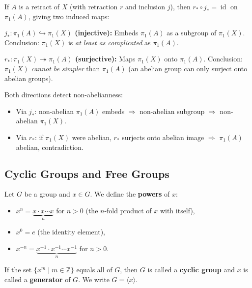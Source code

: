 \documentclass[11pt]{report}
\begin{document}
\begin{rembox}
If $A$ is a retract of $X$ (with retraction $r$ and inclusion $j$), then $r_* \circ j_* = \operatorname{id}$ on $\pi_1(A)$, giving two induced maps:

\textbf{$j_*: \pi_1(A) \hookrightarrow \pi_1(X)$ (injective):} Embeds $\pi_1(A)$ as a subgroup of $\pi_1(X)$. Conclusion: $\pi_1(X)$ is \emph{at least as complicated} as $\pi_1(A)$.

\textbf{$r_*: \pi_1(X) \twoheadrightarrow \pi_1(A)$ (surjective):} Maps $\pi_1(X)$ onto $\pi_1(A)$. Conclusion: $\pi_1(X)$ \emph{cannot be simpler} than $\pi_1(A)$ (an abelian group can only surject onto abelian groups).

Both directions detect non-abelianness:
\begin{itemize}[nosep]
    \item Via $j_*$: non-abelian $\pi_1(A)$ embeds $\Rightarrow$ non-abelian subgroup $\Rightarrow$ non-abelian $\pi_1(X)$.
    \item Via $r_*$: if $\pi_1(X)$ were abelian, $r_*$ surjects onto abelian image $\Rightarrow$ $\pi_1(A)$ abelian, contradiction.
\end{itemize}
\end{rembox}

\subsection{Cyclic Groups and Free Groups}

\begin{defbox}
Let $G$ be a group and $x \in G$. We define the \textbf{powers} of $x$:
\begin{itemize}[nosep]
    \item $x^n = \underbrace{x \cdot x \cdots x}_{n}$ for $n > 0$ (the $n$-fold product of $x$ with itself),
    \item $x^0 = e$ (the identity element),
    \item $x^{-n} = \underbrace{x^{-1} \cdot x^{-1} \cdots x^{-1}}_{n}$ for $n > 0$.
\end{itemize}
If the set $\{x^m \mid m \in \mathbb{Z}\}$ equals all of $G$, then $G$ is called a \textbf{cyclic group} and $x$ is called a \textbf{generator} of $G$. We write $G = \langle x \rangle$.
\end{defbox}
\end{document}
